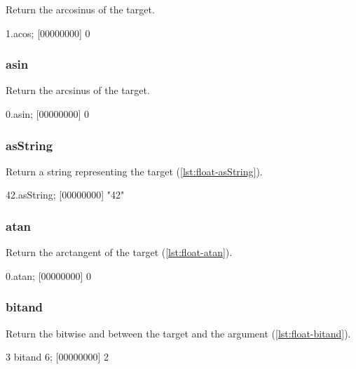 Return the arcosinus of the target.

\begin{urbiscript}[caption=Float.acos, label=lst:float-acos,
  float=\floatposh]
  1.acos;
  [00000000] 0
\end{urbiscript}

\subsubsection{asin}

Return the arcsinus of the target.

\begin{urbiscript}[caption=Float.asin, label=lst:float-asin,
  float=\floatposh]
  0.asin;
  [00000000] 0
\end{urbiscript}

\subsubsection{asString}

Return a string representing the target (\autoref{lst:float-asString}).

\begin{urbiscript}[caption=Float.asString, label=lst:float-asString,
  float=\floatposh]
  42.asString;
  [00000000] "42"
\end{urbiscript}

\subsubsection{atan}

Return the arctangent of the target (\autoref{lst:float-atan}).

\begin{urbiscript}[caption=Float.atan, label=lst:float-atan,
  float=\floatposh]
  0.atan;
  [00000000] 0
\end{urbiscript}

\subsubsection{bitand}

Return the bitwise and between the target and the argument (\autoref{lst:float-bitand}).

\begin{urbiscript}[caption=Float.bitand, label=lst:float-bitand,
  float=\floatposh]
  3 bitand 6;
  [00000000] 2
\end{urbiscript}

